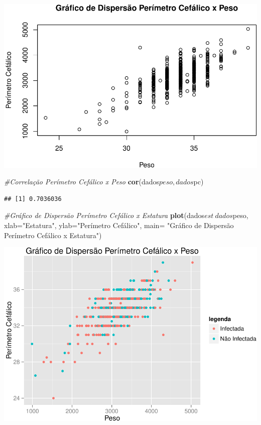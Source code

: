 \documentclass[11pt,]{article}
\makeatletter
\newenvironment{Shaded}{\begin{snugshade}}{\end{snugshade}}
\newcommand{\KeywordTok}[1]{\textcolor[rgb]{0.13,0.29,0.53}{\textbf{{#1}}}}
\newcommand{\DataTypeTok}[1]{\textcolor[rgb]{0.13,0.29,0.53}{{#1}}}
\newcommand{\StringTok}[1]{\textcolor[rgb]{0.31,0.60,0.02}{{#1}}}
\newcommand{\CommentTok}[1]{\textcolor[rgb]{0.56,0.35,0.01}{\textit{{#1}}}}
\newcommand{\NormalTok}[1]{{#1}}
\def\maxwidth{\ifdim\Gin@nat@width>\linewidth\linewidth
\else\Gin@nat@width\fi}
\let\Oldincludegraphics\includegraphics
\renewcommand{\includegraphics}[1]{\Oldincludegraphics[width=\maxwidth]{#1}}
\makeatother
\begin{document}
\includegraphics{versaofinal_lista3_files/figure-latex/unnamed-chunk-9-1.pdf}

\begin{Shaded}
\begin{Highlighting}[]
\CommentTok{#Correlação Perímetro Cefálico x Peso}
\KeywordTok{cor}\NormalTok{(dados$peso,dados$pc)}
\end{Highlighting}
\end{Shaded}

\begin{verbatim}
## [1] 0.7036036
\end{verbatim}

\begin{Shaded}
\begin{Highlighting}[]
\CommentTok{#Gráfico de Dispersão Perímetro Cefálico x Estatura}
\KeywordTok{plot}\NormalTok{(dados$est~dados$peso, }\DataTypeTok{xlab=}\StringTok{"Estatura"}\NormalTok{, }\DataTypeTok{ylab=}\StringTok{"Perímetro Cefálico"}\NormalTok{,}
     \DataTypeTok{main=} \StringTok{"Gráfico de Dispersão Perímetro Cefálico x Estatura"}\NormalTok{)}
\end{Highlighting}
\end{Shaded}

\includegraphics{versaofinal_lista3_files/figure-latex/unnamed-chunk-11-1.pdf}
\end{document}
